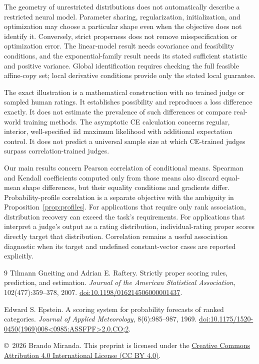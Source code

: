 \documentclass[11pt,letterpaper]{article}
\begin{document}
The geometry of unrestricted distributions does not automatically describe a restricted neural model.
Parameter sharing, regularization, initialization, and optimization may choose a particular shape even when the objective does not identify it.
Conversely, strict properness does not remove misspecification or optimization error.
The linear-model result needs covariance and feasibility conditions, and the exponential-family result needs its stated sufficient statistic and positive variance.
Global identification requires checking the full feasible affine-copy set; local derivative conditions provide only the stated local guarantee.

The exact illustration is a mathematical construction with no trained judge or sampled human ratings.
It establishes possibility and reproduces a loss difference exactly.
It does not estimate the prevalence of such differences or compare real-world training methods.
The asymptotic CE calculation concerns regular, interior, well-specified iid maximum likelihood with additional expectation control.
It does not predict a universal sample size at which CE-trained judges surpass correlation-trained judges.

Our main results concern Pearson correlation of conditional means.
Spearman and Kendall coefficients computed only from those means also discard equal-mean shape differences, but their equality conditions and gradients differ.
Probability-profile correlation is a separate objective with the ambiguity in Proposition~\ref{prop:profiles}.
For applications that require only rank association, distribution recovery can exceed the task's requirements.
For applications that interpret a judge's output as a rating distribution, individual-rating proper scores directly target that distribution.
Correlation remains a useful association diagnostic when its target and undefined constant-vector cases are reported explicitly.

\begin{thebibliography}{9}
Tilmann Gneiting and Adrian E. Raftery.
Strictly proper scoring rules, prediction, and estimation.
\emph{Journal of the American Statistical Association}, 102(477):359--378, 2007.
\href{https://doi.org/10.1198/016214506000001437}{doi:10.1198/016214506000001437}.

Edward S. Epstein.
A scoring system for probability forecasts of ranked categories.
\emph{Journal of Applied Meteorology}, 8(6):985--987, 1969.
\href{https://doi.org/10.1175/1520-0450(1969)008\%3C0985:ASSFPF\%3E2.0.CO;2}{doi:10.1175/1520-0450(1969)008\textless0985:ASSFPF\textgreater2.0.CO;2}.
\end{thebibliography}
\bigskip
\noindent\small\copyright\ 2026 Brando Miranda.
This preprint is licensed under the \href{https://creativecommons.org/licenses/by/4.0/}{Creative Commons Attribution 4.0 International License (CC BY 4.0)}.
\end{document}
